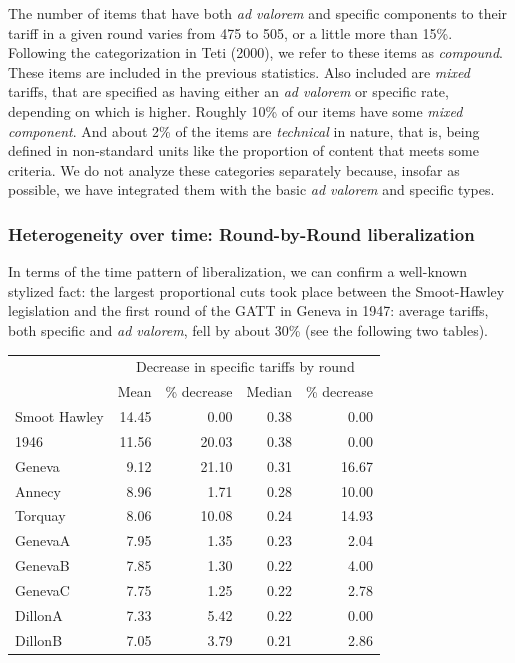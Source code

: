 \documentclass[
  12pt,
]{article}
\begin{document}
The number of items that have both \emph{ad valorem} and specific components to their tariff in a given round varies from 475 to 505, or a little more than 15\%. Following the categorization in Teti (2000), we refer to these items as \emph{compound}. These items are included in the previous statistics. Also included are \emph{mixed} tariffs, that are specified as having either an \emph{ad valorem} or specific rate, depending on which is higher. Roughly 10\% of our items have some \emph{mixed component}. And about 2\% of the items are \emph{technical} in nature, that is, being defined in non-standard units like the proportion of content that meets some criteria. We do not analyze these categories separately because, insofar as possible, we have integrated them with the basic \emph{ad valorem} and specific types.

\hypertarget{heterogeneity-over-time-round-by-round-liberalization}{%
\subsubsection{Heterogeneity over time: Round-by-Round liberalization}\label{heterogeneity-over-time-round-by-round-liberalization}}

In terms of the time pattern of liberalization, we can confirm a well-known stylized fact: the largest proportional cuts took place between the Smoot-Hawley legislation and the first round of the GATT in Geneva in 1947: average tariffs, both specific and \emph{ad valorem}, fell by about 30\% (see the following two tables).

\begin{table}[!h]
\centering
\begin{tabular}[t]{lrrrr}
\toprule
\multicolumn{1}{c}{\bgroup\fontsize{12}{14}\selectfont  \egroup{}} & \multicolumn{4}{c}{\bgroup\fontsize{12}{14}\selectfont Decrease in specific tariffs by round\egroup{}} \\
\cmidrule(l{3pt}r{3pt}){2-5}
  & Mean & \% decrease & Median & \% decrease\\
\midrule
Smoot Hawley & 14.45 & 0.00 & 0.38 & 0.00\\
1946 & 11.56 & 20.03 & 0.38 & 0.00\\
Geneva & 9.12 & 21.10 & 0.31 & 16.67\\
Annecy & 8.96 & 1.71 & 0.28 & 10.00\\
Torquay & 8.06 & 10.08 & 0.24 & 14.93\\
\addlinespace
GenevaA & 7.95 & 1.35 & 0.23 & 2.04\\
GenevaB & 7.85 & 1.30 & 0.22 & 4.00\\
GenevaC & 7.75 & 1.25 & 0.22 & 2.78\\
DillonA & 7.33 & 5.42 & 0.22 & 0.00\\
DillonB & 7.05 & 3.79 & 0.21 & 2.86\\
\bottomrule
\end{tabular}
\end{table}
\end{document}
